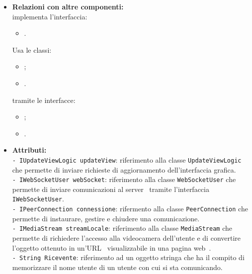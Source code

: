 {{\begin{sloppypar}
{{{\begin{itemize}
			\item[] \textbf{Relazioni con altre componenti:}\\			
				implementa l'interfaccia: 
					\begin{itemize}
						\item[] .
					\end{itemize}
				Usa le classi:
					\begin{itemize}
				 		\item[] ;
				 		\item[]
.
				 	\end{itemize}
				tramite le interfacce:
				 	\begin{itemize}
\item[]; 		\item[].\\
					\end{itemize}
				
				\item[] \textbf{Attributi:}\\
					\texttt{- IUpdateViewLogic updateView}: riferimento alla classe \texttt{UpdateViewLogic} che permette di inviare richieste di aggiornamento dell'interfaccia grafica. \\

					\texttt{- IWebSocketUser webSocket}: riferimento alla classe \texttt{WebSocketUser} che permette di inviare comunicazioni al server\g~ tramite l'interfaccia \texttt{IWebSocketUser}.\\

					\texttt{- IPeerConnection connessione}: rifermento alla classe \texttt{PeerConnection} che permette di instaurare, gestire e chiudere una comunicazione.\\

					\texttt{- IMediaStream streamLocale}: riferimento alla classe \texttt{MediaStream} che permette di richiedere l'accesso alla videocamera dell'utente e di convertire l'oggetto ottenuto in un'URL\g~ visualizzabile in una pagina web\g~.\\

					\texttt{- String Ricevente}: riferimento ad un oggetto stringa che ha il compito di memorizzare il nome utente di un utente con cui si sta comunicando.\\
	

\end{itemize}}}}
\end{sloppypar}}}

